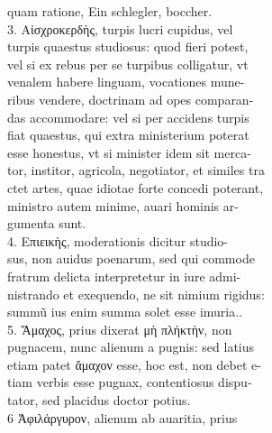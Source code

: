 \documentclass{article}
\begin{document}
\begin{pages}
                quam ratione, Ein schlegler, boccher. \\
                3. Αἰσχροκερδὴς, turpis lucri cupidus, vel \\
                turpis quaestus studiosus: quod fieri potest, \\
                vel si ex rebus per se turpibus colligatur, vt \\
                venalem habere linguam, vocationes mune- \\
                ribus vendere, doctrinam ad opes comparan- \\
                das accommodare: vel si per accidens turpis \\
                fiat quaestus, qui extra ministerium poterat \\
                esse honestus, vt si minister idem sit merca- \\
                tor, institor, agricola, negotiator, et similes tra \\
                ctet artes, quae idiotae forte concedi poterant, \\
                ministro autem minime, auari hominis ar- \\
                gumenta sunt. \\
                4. Επιεικὴς, moderationis dicitur studio- \\
                sus, non auidus poenarum, sed qui commode \\
                fratrum delicta interpretetur in iure admi- \\
                nistrando et exequendo, ne sit nimium rigidus: \\
                summũ ius enim summa solet esse imuria.. \\
                5. Ἄμαχος, prius dixerat μὴ πλήκτὴν, non \\
                pugnacem, nunc alienum a pugnis: sed latius \\
                etiam patet ἄμαχον esse, hoc est, non debet e- \\
                tiam verbis esse pugnax, contentiosus dispu- \\
                tator, sed placidus doctor potius. \\
                6 Ἀφιλάργυρον, alienum ab auaritia, prius \\

\end{pages}
\end{document}
